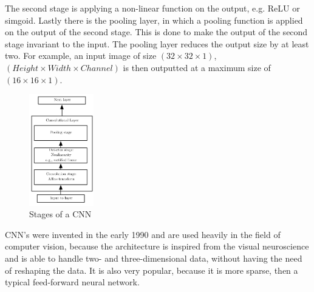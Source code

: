   The second stage is applying a non-linear function on the output, e.g. ReLU or simgoid.
  Lastly there is the pooling layer, in which a pooling function is applied on the output of the second stage. This is done to make the output of the second
  stage invariant to the input. The pooling layer reduces the output size by at least two. For example, an input image of size $(32 \times 32 \times 1)$,
  $(Height \times Width \times Channel)$ is then outputted at a maximum size of $(16 \times 16 \times 1)$.
  \begin{figure}[H]
   \includegraphics[width=0.25\textwidth]{../Images/convlayer.png}
   \centering
   \caption{Stages of a CNN \cite{Goodfellow2016}}
   \label{fig:cnn_stage}
  \end{figure}\noindent
  CNN's were invented in the early 1990 and are used heavily in the field of computer vision, because the architecture is inspired from the visual neuroscience
  and is able to handle two- and three-dimensional data, without having the need of reshaping the data. It is also very popular, because it is more sparse, then
  a typical feed-forward neural network.
  
